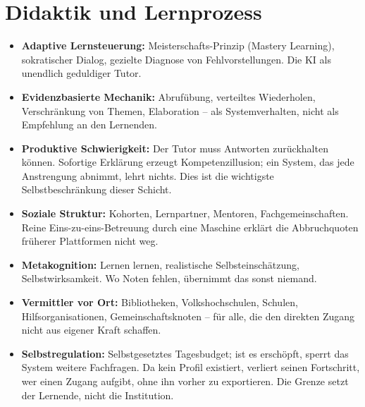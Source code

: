 \documentclass[11pt,a4paper]{article}
\begin{document}
\section{Didaktik und Lernprozess}
\begin{itemize}[label=--]
    \item \textbf{Adaptive Lernsteuerung:} Meisterschafts-Prinzip (Mastery Learning), sokratischer Dialog, gezielte Diagnose von Fehlvorstellungen. Die KI als unendlich geduldiger Tutor.
    \item \textbf{Evidenzbasierte Mechanik:} Abrufübung, verteiltes Wiederholen, Verschränkung von Themen, Elaboration -- als Systemverhalten, nicht als Empfehlung an den Lernenden.
    \item \textbf{Produktive Schwierigkeit:} Der Tutor muss Antworten zurückhalten können. Sofortige Erklärung erzeugt Kompetenzillusion; ein System, das jede Anstrengung abnimmt, lehrt nichts. Dies ist die wichtigste Selbstbeschränkung dieser Schicht.
    \item \textbf{Soziale Struktur:} Kohorten, Lernpartner, Mentoren, Fachgemeinschaften. Reine Eins-zu-eins-Betreuung durch eine Maschine erklärt die Abbruchquoten früherer Plattformen nicht weg.
    \item \textbf{Metakognition:} Lernen lernen, realistische Selbsteinschätzung, Selbstwirksamkeit. Wo Noten fehlen, übernimmt das sonst niemand.
    \item \textbf{Vermittler vor Ort:} Bibliotheken, Volkshochschulen, Schulen, Hilfsorganisationen, Gemeinschaftsknoten -- für alle, die den direkten Zugang nicht aus eigener Kraft schaffen.
    \item \textbf{Selbstregulation:} Selbstgesetztes Tagesbudget; ist es erschöpft, sperrt das System weitere Fachfragen. Da kein Profil existiert, verliert seinen Fortschritt, wer einen Zugang aufgibt, ohne ihn vorher zu exportieren. Die Grenze setzt der Lernende, nicht die Institution.
\end{itemize}
\end{document}
